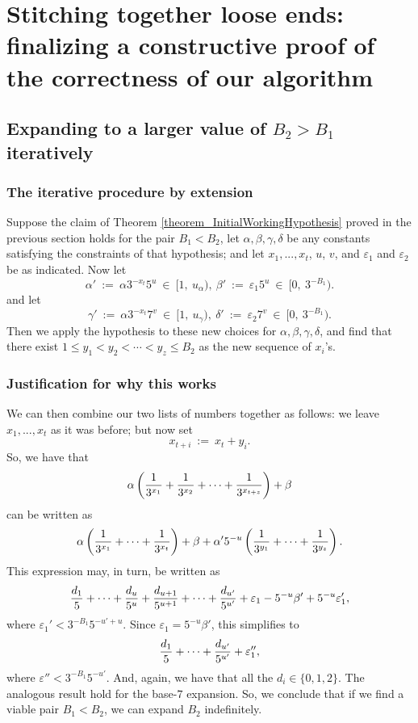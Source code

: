 \documentclass[12pt]{article}
\begin{document}
\section{Stitching together loose ends: finalizing a constructive proof of the correctness of our algorithm} 

\subsection{Expanding to a larger value of $B_2 > B_1$ iteratively}

\subsubsection{The iterative procedure by extension} 

Suppose the claim of Theorem \ref{theorem_InitialWorkingHypothesis} 
proved in the previous section holds for the pair 
$B_1 < B_2$, let $\alpha, \beta, \gamma, \delta$ be any constants 
satisfying the constraints of that hypothesis; and let $x_1, ..., x_t$,
$u$, $v$, and $\varepsilon_1$ and $\varepsilon_2$ be as indicated.  
Now let 
$$
\alpha'\ :=\ \alpha 3^{-x_t}5^u\ \in\ [1,\ u_{\alpha}),\ \beta'\ :=\ \varepsilon_1 5^u\ \in\ 
[0,\ 3^{-B_1}).
$$  
and let
$$
\gamma'\ :=\ \alpha 3^{-x_t}7^v\ \in\ [1,\ u_{\gamma}),\ 
\delta'\ :=\ \varepsilon_2 7^v\ \in\ [0,\ 3^{-B_1}).
$$
Then we apply the hypothesis to these new choices for $\alpha, \beta, \gamma,
\delta$, and find that there exist 
$1 \leq y_1 < y_2 < \cdots < y_z \leq B_2$ as the new sequence of $x_i$'s.  

\subsubsection{Justification for why this works} 

We can then combine our two lists of numbers together as follows:  we leave
$x_1,...,x_t$ as it was before; but now set
$$
x_{t+i}\ :=\ x_t + y_i. 
$$
So, we have that 
$$
\alpha \left ( {1 \over 3^{x_1}} + {1 \over 3^{x_2}} + \cdots + 
{1 \over 3^{x_{t+z}}} \right ) + \beta
$$
can be written as
$$
\alpha \left ( {1 \over 3^{x_1}} + \cdots + {1 \over 3^{x_t}}\right ) + \beta
+ \alpha' 5^{-u} \left ( {1 \over 3^{y_1}} + \cdots + {1 \over 3^{y_z}} \right ).
$$
This expression may, in turn, be written as
$$
{d_1 \over 5} + \cdots + {d_u \over 5^u} + {d_{u+1} \over 5^{u+1}} 
+ \cdots + {d_{u'} \over 5^{u'}} + \varepsilon_1 - 5^{-u} \beta' + 
5^{-u} \varepsilon_1',
$$
where $\varepsilon_1' < 3^{-B_1} 5^{-u'+u}$.  Since $\varepsilon_1 = 5^{-u}\beta'$, this simplifies to
$$
{d_1 \over 5} + \cdots + {d_{u'} \over 5^{u'}} + \varepsilon_1'',
$$
where $\varepsilon'' < 3^{-B_1} 5^{-u'}$.
And, again, we have that all the $d_i \in \{0,1,2\}$.
The analogous result hold for the base-$7$ expansion.  So, we conclude 
that if we find a viable pair $B_1 < B_2$, we can expand $B_2$ indefinitely.
\end{document}
